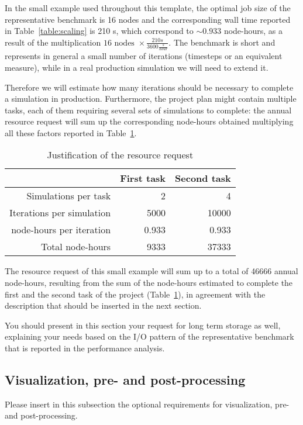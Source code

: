 \documentclass[11pt]{article}
\begin{document}
In the small example used throughout this template, the optimal job size of the representative 
benchmark is 16 nodes and the corresponding wall time reported in Table~\ref{table:scaling} is 
210 s, which correspond to $\sim 0.933$ node-hours, as a result of the multiplication 
$16 \mbox { nodes } \times \frac{210 s}{3600 \frac{s}{hour}}$. 
The benchmark is short and represents in general a small number of iterations (timesteps or 
an equivalent measure), while in a real production simulation we will need to extend it.

Therefore we will estimate how many iterations should be necessary to complete a simulation 
in production. Furthermore, the project plan might contain multiple tasks, each of them requiring 
several sets of simulations to complete: the annual resource request will sum up the corresponding 
node-hours obtained multiplying all these factors reported in Table~\ref{table:resource_request}. 
\begin{table}[H]
 \begin{center}
  \begin{tabular}{@{}*3{r}@{}}
   \hline \hline
   & First task & Second task \\ 
   \hline \hline
   Simulations per task & 2 & 4 \\
   Iterations per simulation & 5000 & 10000 \\
   node-hours per iteration & 0.933 & 0.933 \\
   Total node-hours & 9333 & 37333 \\
   \hline \hline
  \end{tabular}
 \end{center}
 \caption{Justification of the resource request}
 \label{table:resource_request}
\end{table}
The resource request of this small example will sum up to a total of 46666 annual node-hours, resulting from the 
sum of the node-hours estimated to complete the first and the second task of the project 
(Table~\ref{table:resource_request}), in agreement with the description that should be inserted in 
the next section. 

You should present in this section your request for long term storage as well, explaining your needs 
based on the I/O pattern of the representative benchmark that is reported in the performance analysis. 
 
\subsection{Visualization, pre- and post-processing}
Please insert in this subsection the optional requirements for visualization, pre- and post-processing.
\end{document}
